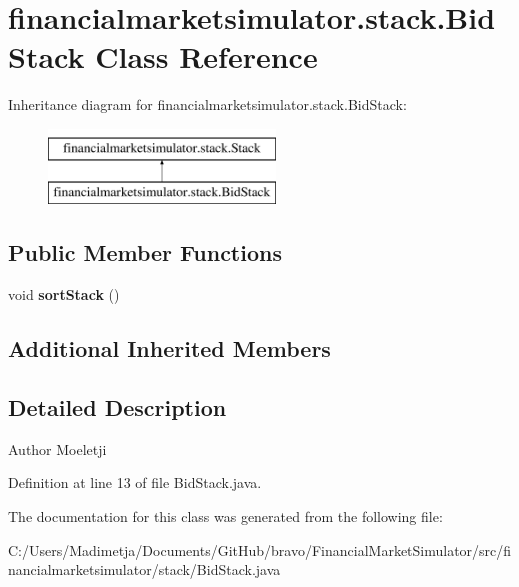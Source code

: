 \hypertarget{classfinancialmarketsimulator_1_1stack_1_1_bid_stack}{\section{financialmarketsimulator.\+stack.\+Bid\+Stack Class Reference}
\label{classfinancialmarketsimulator_1_1stack_1_1_bid_stack}
}
Inheritance diagram for financialmarketsimulator.\+stack.\+Bid\+Stack\+:\begin{figure}[H]
\begin{center}
\leavevmode
\includegraphics[height=2.000000cm]{classfinancialmarketsimulator_1_1stack_1_1_bid_stack}
\end{center}
\end{figure}
\subsection*{Public Member Functions}
\begin{DoxyCompactItemize}
\item 
\hypertarget{classfinancialmarketsimulator_1_1stack_1_1_bid_stack_a5c2694a816c3fb93081f61554d60fc42}{void {\bfseries sort\+Stack} ()}\label{classfinancialmarketsimulator_1_1stack_1_1_bid_stack_a5c2694a816c3fb93081f61554d60fc42}

\end{DoxyCompactItemize}
\subsection*{Additional Inherited Members}


\subsection{Detailed Description}
\begin{DoxyAuthor}{Author}
Moeletji 
\end{DoxyAuthor}


Definition at line 13 of file Bid\+Stack.\+java.



The documentation for this class was generated from the following file\+:\begin{DoxyCompactItemize}
\item 
C\+:/\+Users/\+Madimetja/\+Documents/\+Git\+Hub/bravo/\+Financial\+Market\+Simulator/src/financialmarketsimulator/stack/Bid\+Stack.\+java\end{DoxyCompactItemize}
